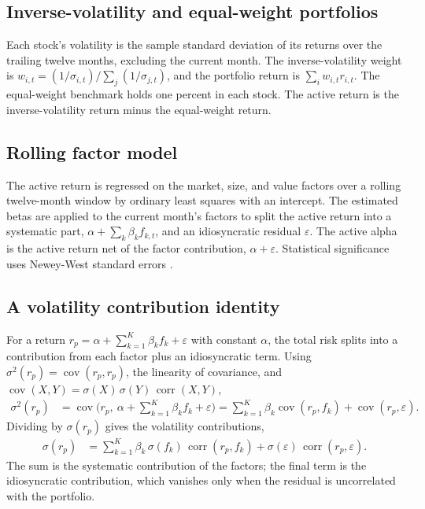 \documentclass[11pt]{article}
\begin{document}
\subsection{Inverse-volatility and equal-weight portfolios}

Each stock's volatility is the sample standard deviation of its returns over the trailing twelve
months, excluding the current month. The inverse-volatility weight is
$w_{i,t} = (1/\sigma_{i,t}) / \sum_j (1/\sigma_{j,t})$, and the portfolio return is
$\sum_i w_{i,t} r_{i,t}$. The equal-weight benchmark holds one percent in each stock. The active
return is the inverse-volatility return minus the equal-weight return.

\subsection{Rolling factor model}

The active return is regressed on the market, size, and value factors over a rolling twelve-month
window by ordinary least squares with an intercept. The estimated betas are applied to the current
month's factors to split the active return into a systematic part, $\alpha + \sum_k \beta_k f_{k,t}$,
and an idiosyncratic residual $\varepsilon$. The active alpha is the active return net of the factor
contribution, $\alpha + \varepsilon$. Statistical significance uses Newey-West standard errors
\citep{newey1987}.

\subsection{A volatility contribution identity}

For a return $r_p = \alpha + \sum_{k=1}^K \beta_k f_k + \varepsilon$ with constant $\alpha$, the
total risk splits into a contribution from each factor plus an idiosyncratic term. Using
$\sigma^2(r_p) = \operatorname{cov}(r_p, r_p)$, the linearity of covariance, and
$\operatorname{cov}(X,Y) = \sigma(X)\,\sigma(Y)\,\operatorname{corr}(X,Y)$,
\begin{align}
\sigma^2(r_p)
  &= \operatorname{cov}\Big(r_p,\ \alpha + \sum_{k=1}^K \beta_k f_k + \varepsilon\Big)
   = \sum_{k=1}^K \beta_k \operatorname{cov}(r_p, f_k) + \operatorname{cov}(r_p, \varepsilon).
\end{align}
Dividing by $\sigma(r_p)$ gives the volatility contributions,
\begin{align}
\sigma(r_p)
  &= \sum_{k=1}^K \beta_k \, \sigma(f_k) \, \operatorname{corr}(r_p, f_k)
   + \sigma(\varepsilon)\,\operatorname{corr}(r_p, \varepsilon).
\end{align}
The sum is the systematic contribution of the factors; the final term is the idiosyncratic
contribution, which vanishes only when the residual is uncorrelated with the portfolio.
\end{document}
